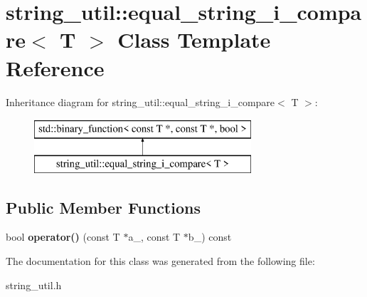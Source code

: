 \section{string\+\_\+util\+:\+:equal\+\_\+string\+\_\+i\+\_\+compare$<$ T $>$ Class Template Reference}
\label{classstring__util_1_1equal__string__i__compare}
Inheritance diagram for string\+\_\+util\+:\+:equal\+\_\+string\+\_\+i\+\_\+compare$<$ T $>$\+:\begin{figure}[H]
\begin{center}
\leavevmode
\includegraphics[height=2.000000cm]{classstring__util_1_1equal__string__i__compare}
\end{center}
\end{figure}
\subsection*{Public Member Functions}
\begin{DoxyCompactItemize}
\item 
bool {\bfseries operator()} (const T $\ast$a\+\_\+, const T $\ast$b\+\_\+) const \label{classstring__util_1_1equal__string__i__compare_af8c94159bbb8903c7cf7b71941a7d2bc}

\end{DoxyCompactItemize}


The documentation for this class was generated from the following file\+:\begin{DoxyCompactItemize}
\item 
string\+\_\+util.\+h\end{DoxyCompactItemize}
